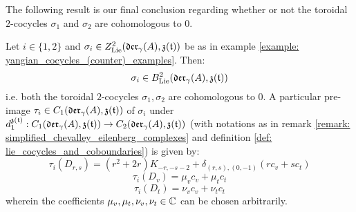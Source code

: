         The following result is our final conclusion regarding whether or not the toroidal $2$-cocycles $\sigma_1$ and $\sigma_2$ are cohomologous to $0$.
        \begin{theorem} \label{theorem: non_trivial_yangian_cocycles_examples}
            Let $i \in \{1, 2\}$ and $\sigma_i \in Z^2_{\mathrm{Lie}}(\mathfrak{der}_{\gamma}(A), \mathfrak{z}(\mathfrak{t}))$ be as in example \ref{example: yangian_cocycles_(counter)_examples}. Then:
                $$\sigma_i \in B^2_{\mathrm{Lie}}(\mathfrak{der}_{\gamma}(A), \mathfrak{z}(\mathfrak{t}))$$
            i.e. both the toroidal $2$-cocycles $\sigma_1, \sigma_2$ are cohomologous to $0$. A particular pre-image $\tau_i \in C_1(\mathfrak{der}_{\gamma}(A), \mathfrak{z}(\mathfrak{t}))$ of $\sigma_i$ under $d_1^{\mathfrak{z}(\mathfrak{t})}: C_1(\mathfrak{der}_{\gamma}(A), \mathfrak{z}(\mathfrak{t})) \to C_2(\mathfrak{der}_{\gamma}(A), \mathfrak{z}(\mathfrak{t}))$ (with notations as in remark \ref{remark: simplified_chevalley_eilenberg_complexes} and definition \ref{def: lie_cocycles_and_coboundaries}) is given by:
                $$\tau_i(D_{r, s}) = ( r^2 + 2r ) K_{-r, -s - 2} + \delta_{(r, s), (0, -1)} ( r c_v + s c_t )$$
                $$\tau_i(D_v) = \mu_v c_v + \mu_t c_t$$
                $$\tau_i(D_t) = \nu_v c_v + \nu_t c_t$$
            wherein the coefficients $\mu_v, \mu_t, \nu_v, \nu_t \in \mathbb{C}$ can be chosen arbitrarily.
        \end{theorem}
